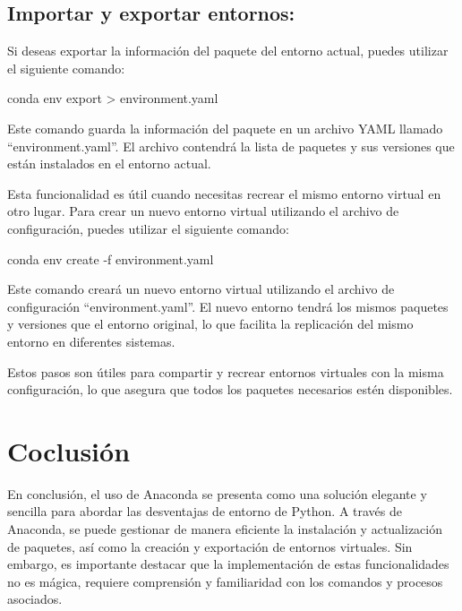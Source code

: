 \documentclass[
  jou,
  floatsintext,
  longtable,
  a4paper,
  nolmodern,
  notxfonts,
  notimes,
  colorlinks=true,linkcolor=blue,citecolor=blue,urlcolor=blue]{apa7}
\newenvironment{Shaded}{\begin{snugshade}}{\end{snugshade}}
\newcommand{\AttributeTok}[1]{\textcolor[rgb]{0.40,0.45,0.13}{#1}}
\newcommand{\ExtensionTok}[1]{\textcolor[rgb]{0.00,0.23,0.31}{#1}}
\newcommand{\NormalTok}[1]{\textcolor[rgb]{0.00,0.23,0.31}{#1}}
\newcommand{\OperatorTok}[1]{\textcolor[rgb]{0.37,0.37,0.37}{#1}}
\begin{document}
\subsection{Importar y exportar
entornos:}\label{importar-y-exportar-entornos}

Si deseas exportar la información del paquete del entorno actual, puedes
utilizar el siguiente comando:

\begin{Shaded}
\begin{Highlighting}[]
\ExtensionTok{conda}\NormalTok{ env export }\OperatorTok{\textgreater{}}\NormalTok{ environment.yaml}
\end{Highlighting}
\end{Shaded}

Este comando guarda la información del paquete en un archivo YAML
llamado ``environment.yaml''. El archivo contendrá la lista de paquetes
y sus versiones que están instalados en el entorno actual.

Esta funcionalidad es útil cuando necesitas recrear el mismo entorno
virtual en otro lugar. Para crear un nuevo entorno virtual utilizando el
archivo de configuración, puedes utilizar el siguiente comando:

\begin{Shaded}
\begin{Highlighting}[]
\ExtensionTok{conda}\NormalTok{ env create }\AttributeTok{{-}f}\NormalTok{ environment.yaml}
\end{Highlighting}
\end{Shaded}

Este comando creará un nuevo entorno virtual utilizando el archivo de
configuración ``environment.yaml''. El nuevo entorno tendrá los mismos
paquetes y versiones que el entorno original, lo que facilita la
replicación del mismo entorno en diferentes sistemas.

Estos pasos son útiles para compartir y recrear entornos virtuales con
la misma configuración, lo que asegura que todos los paquetes necesarios
estén disponibles.

\section{Coclusión}\label{coclusiuxf3n}

En conclusión, el uso de Anaconda se presenta como una solución elegante
y sencilla para abordar las desventajas de entorno de Python. A través
de Anaconda, se puede gestionar de manera eficiente la instalación y
actualización de paquetes, así como la creación y exportación de
entornos virtuales. Sin embargo, es importante destacar que la
implementación de estas funcionalidades no es mágica, requiere
comprensión y familiaridad con los comandos y procesos asociados.
\end{document}
